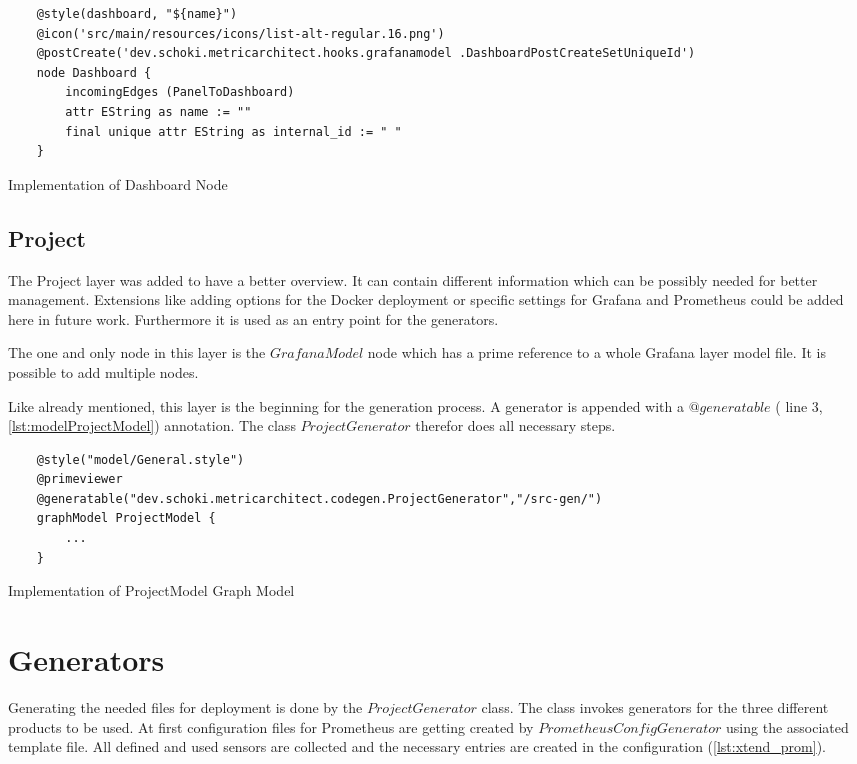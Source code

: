 \begin{listing}[!ht]
	\begin{verbatim}
	@style(dashboard, "${name}")
	@icon('src/main/resources/icons/list-alt-regular.16.png')
	@postCreate('dev.schoki.metricarchitect.hooks.grafanamodel .DashboardPostCreateSetUniqueId')
	node Dashboard {
		incomingEdges (PanelToDashboard)
		attr EString as name := ""
		final unique attr EString as internal_id := " " 
	}
	\end{verbatim}
	\caption{Implementation of Dashboard Node}
	\label{lst:nodeDashboard}
\end{listing}
\subsection{Project}
The Project layer was added to have a better overview. It can contain different information which can be possibly needed for better management. Extensions like adding options for the Docker deployment or specific settings for Grafana and Prometheus could be added here in future work. Furthermore it is used as an entry point for the generators. 

The one and only node in this layer is the $GrafanaModel$ node which has a prime reference to a whole Grafana layer model file. It is possible to add multiple nodes.

Like already mentioned, this layer is the beginning for the generation process. A generator is appended with a $@generatable$ ( line 3, \cref{lst:modelProjectModel}) annotation. The class $ProjectGenerator$ therefor does all necessary steps. 

\begin{listing}[!ht]
	\begin{verbatim}
	@style("model/General.style")
	@primeviewer
	@generatable("dev.schoki.metricarchitect.codegen.ProjectGenerator","/src-gen/")
	graphModel ProjectModel {
		...
	}
	\end{verbatim}
	\caption{Implementation of ProjectModel Graph Model}
	\label{lst:modelProjectModel}
\end{listing}

\section{Generators}
\label{sec:impl_generator}

Generating the needed files for deployment is done by the $ProjectGenerator$ class. The class invokes generators for the three different products to be used. At first configuration files for Prometheus are getting created by $PrometheusConfigGenerator$ using the associated template file. All defined and used sensors are collected and the necessary entries are created in the configuration (\cref{lst:xtend_prom}).

